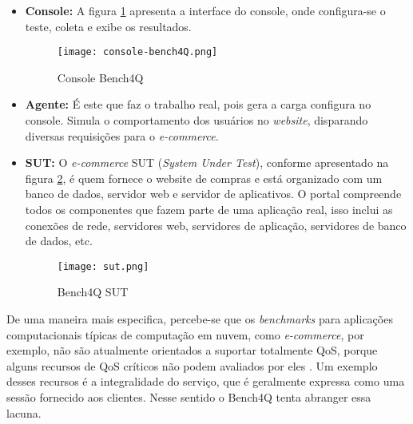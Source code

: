 \begin{itemize}
	
	\item \textbf{Console:} A figura \ref{fig:console-bench4q} apresenta a interface do console, onde configura-se o teste, coleta e exibe os resultados. 
	
	\begin{figure}[!htb]
		\centering
		\texttt{[image: console-bench4Q.png]}
		\caption{Console Bench4Q}
		\label{fig:console-bench4q}
	\end{figure}
	
	\item \textbf{Agente:} É este que faz o trabalho real, pois gera a carga configura no console. Simula o comportamento dos usuários no \textit{website}, disparando diversas requisições para o \textit{e-commerce}. 
	
	\item \textbf{SUT:} O \textit{e-commerce} SUT (\textit{System Under Test}), conforme apresentado na figura \ref{fig:sut},  é quem fornece o website de compras e está organizado com um banco de dados, servidor web e servidor de aplicativos. O portal compreende todos os componentes que fazem parte de uma aplicação real, isso inclui as conexões de rede, servidores web, servidores de aplicação, servidores de banco de dados, etc.
	
	\begin{figure}[htb]
		\centering
		\texttt{[image: sut.png]}
		\caption{Bench4Q SUT}
		\label{fig:sut}
	\end{figure}
	
\end{itemize}

De uma maneira mais especifica, percebe-se que os \textit{benchmarks} para aplicações computacionais típicas de computação em nuvem, como \textit{e-commerce}, por exemplo, não são atualmente orientados a suportar totalmente QoS, porque alguns recursos de QoS críticos não podem avaliados por eles \cite{Zhang2011}. Um exemplo desses recursos é a integralidade do serviço, que é geralmente expressa como uma sessão fornecido aos clientes. Nesse sentido o Bench4Q tenta abranger essa lacuna.



